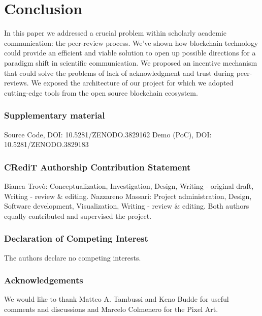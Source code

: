 \documentclass[runningheads]{llncs}
\begin{document}
\section{Conclusion}
In this paper we addressed a crucial problem within scholarly academic communication: the peer-review process. We've shown how blockchain technology could provide an efficient and viable solution to open up possible directions for a paradigm shift in scientific communication. We proposed an incentive mechanism that could solve the problems of lack of acknowledgment and trust during peer-reviews. We exposed the architecture of our project for which we adopted cutting-edge tools from the open source blockchain ecosystem.

\subsubsection{Supplementary material}
Source Code, DOI: 10.5281/ZENODO.3829162
\newline Demo (PoC), DOI: 10.5281/ZENODO.3829183

\subsubsection{CRediT Authorship Contribution Statement}
 Bianca Trovò: Conceptualization, Investigation, Design, Writing - original draft, Writing - review \& editing. Nazzareno Massari: Project administration, Design, Software development, Visualization, Writing - review \& editing. Both authors equally contributed and supervised the project.

\subsubsection{Declaration of Competing Interest}
The authors declare no competing interests.

\subsubsection{Acknowledgements} We would like to thank Matteo A. Tambussi and Keno Budde for useful comments and discussions and Marcelo Colmenero for the Pixel Art.


%
%


\end{document}
